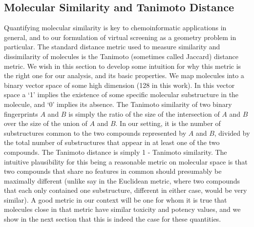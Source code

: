 \documentclass[journal=jacsat,manuscript=article]{achemso}
\begin{document}


\subsection*{Molecular Similarity and Tanimoto Distance}

Quantifying molecular similarity is key to chemoinformatic applications in general\cite{Bender2004b}, and to our formulation of virtual screening as a geometry problem in particular.
The standard distance metric used to measure similarity and dissimilarity of molecules is the Tanimoto (sometimes called Jaccard) distance metric\cite{Bajusz2015}.  We wish in this section to develop some intuition for why this metric is the right one for our analysis, and its basic properties.
We map molecules into a binary vector space of some high dimension (128 in this work). In this vector space a `1' implies the existence of some specific molecular substructure in the molecule, and `0' implies its absence.  \newline
\newline
The Tanimoto similarity of two binary fingerprints $A$ and $B$ is simply the ratio of the size of the intersection of $A$ and $B$ over the size of the union of $A$ and $B$\cite{Bajusz2015}. In our setting, it is the number of substructures common to the two compounds represented by $A$ and $B$, divided by the total number of substructures that appear in at least one of the two compounds. The Tanimoto distance is simply 1 - Tanimoto similarity.  The intuitive plausibility for this being a reasonable metric on molecular space is that two compounds that share no features in common should presumably be maximally different (unlike say in the Euclidean metric, where two compounds that each only contained one substructure, different in either case, would be very similar).
\newline
\newline
A good metric in our context will be one for whom it is true that molecules close in that metric have similar toxicity and potency values, and we show in the next section that this is indeed the case for these quantities.
\end{document}
